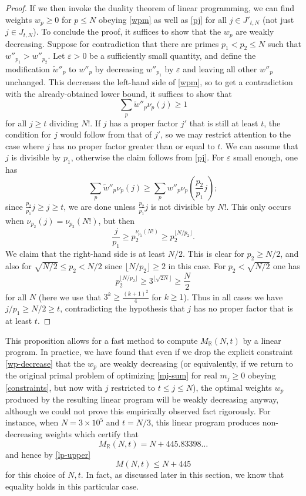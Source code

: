 \documentclass[12pt,a4paper,reqno]{amsart}
\numberwithin{equation}{section}
\theoremstyle{plain}
\theoremstyle{definition}
\newcommand\R{\mathbb{R}}
\newcommand\eps{\varepsilon}
\begin{document}
\begin{proof}
If we then invoke the duality theorem of linear programming, we can find weights $w_p \geq 0$ for $p \leq N$ obeying \eqref{wpm} as well as \eqref{pj} for all $j \in J'_{t,N}$ (not just $j \in J_{t,N}$).  To conclude the proof, it suffices to show that the $w_p$ are weakly decreasing. Suppose for contradiction that there are primes $p_1 < p_2 \leq N$ such that $w''_{p_1} > w''_{p_2}$.  Let $\eps>0$ be a sufficiently small quantity, and define the modification $\tilde w''_p$ to $w''_p$ by decreasing $w''_{p_1}$ by $\eps$ and leaving all other $w''_p$ unchanged.  This decreases the left-hand side of \eqref{wpm}, so to get a contradiction with the already-obtained lower bound, it suffices to show that
  $$ \sum_p \tilde w''_p \nu_p(j) \geq 1$$
  for all $j \geq t$ dividing $N!$.  If $j$ has a proper factor $j'$ that is still at least $t$, the condition for $j$ would follow from that of $j'$, so we may restrict attention to the case where $j$ has no proper factor greater than or equal to $t$.  We can assume that $j$ is divisible by $p_1$, otherwise the claim follows from \eqref{pj}.  For $\eps$ small enough, one has
  $$ \sum_p \tilde w''_p \nu_p(j) \geq \sum_p w''_p \nu_p(\frac{p_2}{p_1} j);$$
since $\frac{p_2}{p_1} j \geq j \geq t$, we are done unless $\frac{p_2}{p_1} j$ is not divisible by $N!$. This only occurs when $\nu_{p_2}(j) = \nu_{p_2}(N!)$, but then
$$ \frac{j}{p_1} \geq p_2^{\nu_{p_2}(N!)} \geq p_2^{\lfloor N/p_2\rfloor}.$$
We claim that the right-hand side is at least $N/2$.  This is clear for $p_2 \geq N/2$, and also for $\sqrt{N/2} \leq p_2 < N/2$ since $\lfloor N/p_2\rfloor \geq 2$ in this case.  For $p_2 < \sqrt{N/2}$ one has 
$$  p_2^{\lfloor N/p_2\rfloor} \geq 3^{\lfloor \sqrt{2N} \rfloor} \geq \frac{N}{2}$$
for all $N$ (here we use that $3^k \geq \frac{(k+1)^2}{4}$ for $k \geq 1$).  Thus in all cases we have $j/p_1 \geq N/2 \geq t$, contradicting the hypothesis that $j$ has no proper factor that is at least $t$.
\end{proof}

This proposition allows for a fast method to compute $M_\R(N,t)$ by a linear program.  In practice, we have found that even if we drop the explicit constraint \eqref{wp-decrease} that the $w_p$ are weakly decreasing (or equivalently, if we return to the original primal problem of optimizing \eqref{mj-sum} for real $m_j \geq 0$ obeying \eqref{constraints}, but now with $j$ restricted to $t \leq j \leq N$), the optimal weights $w_p$ produced by the resulting linear program will be weakly decreasing anyway, although we could not prove this empirically observed fact rigorously.  For instance, when $N = 3 \times 10^5$ and $t = N/3$, this linear program produces non-decreasing weights which certify that
$$ M_\R(N,t) = N + 445.83398\dots$$
and hence by \eqref{lp-upper}
\begin{equation}\label{mnt}
  M(N,t) \leq N + 445
\end{equation}
for this choice of $N,t$.  In fact, as discussed later in this section, we know that equality holds in this particular case.
\end{document}
